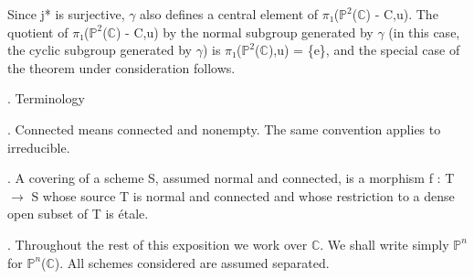 \documentclass[10pt,a4paper]{article}
\begin{document}
\begin{adjustbox}{max totalsize={\textwidth}{0.945\textheight},center}
\begin{minipage}{\textwidth}
\noindent Since j* is surjective, \ensuremath{γ} also defines a central element of \ensuremath{π₁}(\ensuremath{ℙ^2}(\ensuremath{ℂ}) - C,u). The quotient of \ensuremath{π₁}(\ensuremath{ℙ^2}(\ensuremath{ℂ}) - C,u) by the normal subgroup generated by \ensuremath{γ} (in this case, the cyclic subgroup generated by \ensuremath{γ}) is \ensuremath{π₁}(\ensuremath{ℙ^2}(\ensuremath{ℂ}),u) = \{e\}, and the special case of the theorem under consideration follows.\par\smallskip
{}. Terminology\par\smallskip
{}. Connected means connected and nonempty. The same convention applies to irreducible.\par\smallskip
{}. A covering of a scheme S, assumed normal and connected, is a morphism f : T \ensuremath{→} S whose source T is normal and connected and whose restriction to a dense open subset of T is étale.\par\smallskip
{}. Throughout the rest of this exposition we work over \ensuremath{ℂ}. We shall write simply \ensuremath{ℙ^n} for \ensuremath{ℙ^n}(\ensuremath{ℂ}). All schemes considered are assumed separated.\par\smallskip
\end{minipage}
\end{adjustbox}
\newpage
\end{document}
